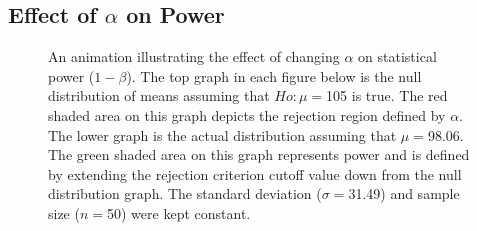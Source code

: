 \documentclass[10pt,openany]{book}\usepackage[]{graphicx}\usepackage[]{color}
\newenvironment{knitrout}{}{} %
\begin{document}
\subsection{Effect of $\alpha$ on Power}
\begin{knitrout}
\color{fgcolor}























\begin{figure}[hbtp]

{\centering {}

}

\caption[An animation illustrating the effect of changing $\alpha$ on statistical power ($1-\beta$)]{An animation illustrating the effect of changing $\alpha$ on statistical power ($1-\beta$).  The top graph in each figure below is the null distribution of means assuming that $Ho:\mu=$105 is true.  The red shaded area on this graph depicts the rejection region defined by $\alpha$.  The lower graph is the actual distribution assuming that $\mu=$98.06.  The green shaded area on this graph represents power and is defined by extending the rejection criterion cutoff value down from the null distribution graph.  The standard deviation ($\sigma=$31.49) and sample size ($n=$50) were kept constant.}\label{fig:pwrAnimA}
\end{figure}


\end{knitrout}

\newpage
\end{document}

